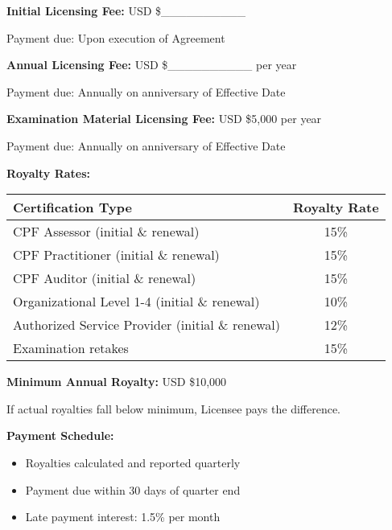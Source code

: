 \documentclass[11pt,a4paper]{article}
\begin{document}
\textbf{Initial Licensing Fee:} USD \$\_\_\_\_\_\_\_\_\_\_

Payment due: Upon execution of Agreement

\vspace{1em}

\textbf{Annual Licensing Fee:} USD \$\_\_\_\_\_\_\_\_\_\_ per year

Payment due: Annually on anniversary of Effective Date

\vspace{1em}

\textbf{Examination Material Licensing Fee:} USD \$5,000 per year

Payment due: Annually on anniversary of Effective Date

\vspace{1em}

\textbf{Royalty Rates:}

\begin{tabular}{|l|c|}
\hline
\textbf{Certification Type} & \textbf{Royalty Rate} \\
\hline
CPF Assessor (initial \& renewal) & 15\% \\
CPF Practitioner (initial \& renewal) & 15\% \\
CPF Auditor (initial \& renewal) & 15\% \\
Organizational Level 1-4 (initial \& renewal) & 10\% \\
Authorized Service Provider (initial \& renewal) & 12\% \\
Examination retakes & 15\% \\
\hline
\end{tabular}

\vspace{1em}

\textbf{Minimum Annual Royalty:} USD \$10,000

If actual royalties fall below minimum, Licensee pays the difference.

\vspace{1em}

\textbf{Payment Schedule:}

\begin{itemize}
\item Royalties calculated and reported quarterly
\item Payment due within 30 days of quarter end
\item Late payment interest: 1.5\% per month
\end{itemize}

\vspace{1em}
\end{document}
